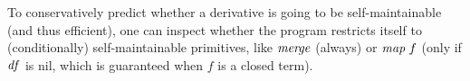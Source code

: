 
To conservatively predict whether a derivative is going to be
self-maintainable (and thus efficient), one can inspect whether
the program restricts itself to (conditionally) self-maintainable
primitives, like $\mathit{merge}$ (always) or $\mathit{map} \; f$ (only if $\mathit{df}$ is nil, which is guaranteed when $f$ is a closed term).


